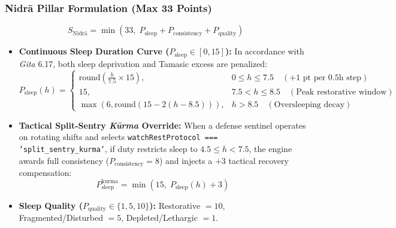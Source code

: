 \documentclass[11pt,a4paper]{article}
\begin{document}
\subsubsection{Nidr\=a Pillar Formulation (Max 33 Points)}
\begin{equation}
    S_{\text{Nidr\=a}} = \min(33,\; P_{\text{sleep}} + P_{\text{consistency}} + P_{\text{quality}})
\end{equation}
\begin{itemize}[leftmargin=*]
    \item \textbf{Continuous Sleep Duration Curve ($P_{\text{sleep}} \in [0, 15]$):} In accordance with \textit{Gita} 6.17, both sleep deprivation and Tamasic excess are penalized:
    \begin{equation}
        P_{\text{sleep}}(h) = \begin{cases}
            \text{round}\left(\frac{h}{7.5} \times 15\right), & 0 \le h \le 7.5 \quad (+1\text{ pt per } 0.5\text{h step}) \\
            15, & 7.5 < h \le 8.5 \quad (\text{Peak restorative window}) \\
            \max(6, \text{round}(15 - 2(h - 8.5))), & h > 8.5 \quad (\text{Oversleeping decay})
        \end{cases}
    \end{equation}
    \item \textbf{Tactical Split-Sentry \textit{K\=urma} Override:} When a defense sentinel operates on rotating shifts and selects \texttt{watchRestProtocol === 'split\_sentry\_kurma'}, if duty restricts sleep to $4.5 \le h < 7.5$, the engine awards full consistency ($P_{\text{consistency}} = 8$) and injects a $+3$ tactical recovery compensation:
    \begin{equation}
        P_{\text{sleep}}^{\text{kurma}} = \min(15,\; P_{\text{sleep}}(h) + 3)
    \end{equation}
    \item \textbf{Sleep Quality ($P_{\text{quality}} \in \{1, 5, 10\}$):} Restorative $= 10$, Fragmented/Disturbed $= 5$, Depleted/Lethargic $= 1$.
\end{itemize}
\end{document}
